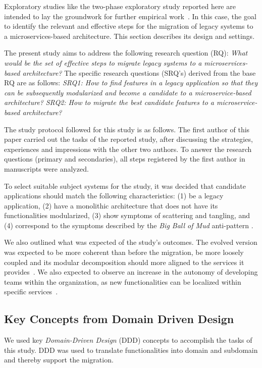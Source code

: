 \documentclass[a4paper,twoside]{article}
\begin{document}
\noindent Exploratory studies like the two-phase exploratory study reported here are intended to lay the groundwork for further empirical work~\cite{seaman1999qualitative}.
In this case, the goal to identify the relevant and effective steps for the migration of legacy systems to a microservices-based architecture. This section describes its design and settings.

The present study aims to address the following research question (RQ): \textit{What would be the set of effective steps to migrate legacy systems to a microservices-based architecture?} The specific research questions (SRQ's) derived from the base RQ are as follows: \textit{SRQ1: How to find features in a legacy application so that they can be subsequently modularized and become a candidate to a microservice-based architecture?} \textit{SRQ2: How to migrate the best candidate features to a microservice-based architecture?}

\noindent The study protocol followed for this study is as follows. The first author of this paper carried out the tasks of the reported study, after discussing the strategies, experiences and impressions with the other two authors. To answer the research questions (primary and secondaries), all steps registered by the first author in manuscripts were analyzed.

To select suitable subject systems for the study, it was decided that candidate applications should match the following characteristics: (1) be a legacy application, (2) have a monolithic architecture that does not have its functionalities modularized, (3) show symptoms of scattering and tangling, and (4) correspond to the symptoms described by the \textit{Big Ball of Mud} anti-pattern \cite{foote1997big}.

We also outlined what was expected of the study's outcomes. The evolved version was expected to be more coherent than before the migration, be more loosely coupled and its modular decomposition should more aligned to the services it provides~\cite{newman2015building}. We also expected to observe an increase in the autonomy of developing teams within the organization, as new functionalities can be localized within specific services~\cite{newman2015building}.

\subsection{Key Concepts from Domain Driven Design}
We used key \textit{Domain-Driven Design} (DDD) concepts to accomplish the tasks of this study. DDD was used to translate functionalities into domain and subdomain and thereby support the migration.
\end{document}
